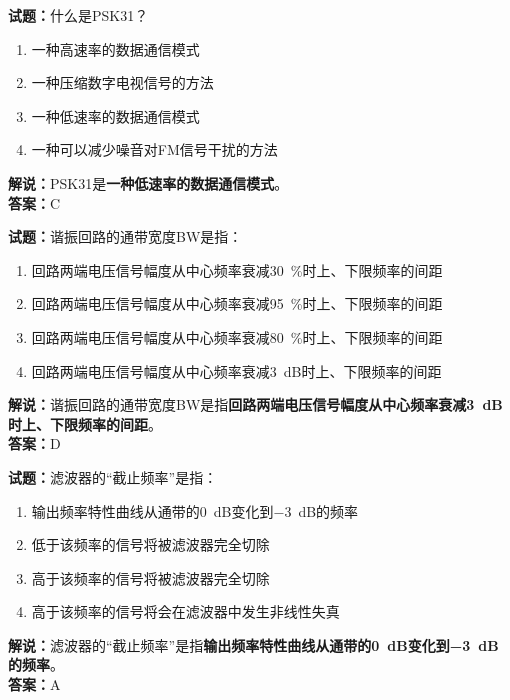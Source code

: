 \documentclass{ctexbook}
\begin{document}
\bigskip


\noindent\textbf{试题：}什么是PSK31？
\begin{enumerate}[leftmargin=3em]
\item 一种高速率的数据通信模式
\item 一种压缩数字电视信号的方法
\item 一种低速率的数据通信模式
\item 一种可以减少噪音对FM信号干扰的方法
\end{enumerate}
\noindent\textbf{解说：}PSK31是\textbf{一种低速率的数据通信模式}。\\\noindent\textbf{答案：}C




\bigskip


\noindent\textbf{试题：}谐振回路的通带宽度BW是指：
\begin{enumerate}[leftmargin=3em]
\item 回路两端电压信号幅度从中心频率衰减\qty{30}{\percent}时上、下限频率的间距
\item 回路两端电压信号幅度从中心频率衰减\qty{95}{\percent}时上、下限频率的间距
\item 回路两端电压信号幅度从中心频率衰减\qty{80}{\percent}时上、下限频率的间距
\item 回路两端电压信号幅度从中心频率衰减\SI{3}{\dB}时上、下限频率的间距
\end{enumerate}
\noindent\textbf{解说：}谐振回路的通带宽度BW是指\textbf{回路两端电压信号幅度从中心频率衰减\SI{3}{\dB}时上、下限频率的间距}。\\\noindent\textbf{答案：}D



\bigskip


\noindent\textbf{试题：}滤波器的“截止频率”是指：
\begin{enumerate}[leftmargin=3em]
\item 输出频率特性曲线从通带的\SI{0}{\dB}变化到\SI{-3}{\dB}的频率
\item 低于该频率的信号将被滤波器完全切除
\item 高于该频率的信号将被滤波器完全切除
\item 高于该频率的信号将会在滤波器中发生非线性失真
\end{enumerate}
\noindent\textbf{解说：}滤波器的“截止频率”是指\textbf{输出频率特性曲线从通带的\SI{0}{\dB}变化到\SI{-3}{\dB}的频率}。\\\noindent\textbf{答案：}A



\bigskip
\end{document}
